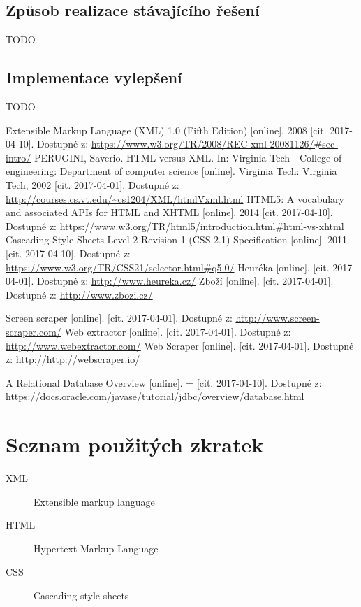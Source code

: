 \documentclass[thesis=B,czech]{FITthesis}[2012/06/26]
\begin{document}
\section{Způsob realizace stávajícího řešení}
TODO
\section{Implementace vylepšení}
TODO

\begin{conclusion}
\end{conclusion}




\begin{thebibliography}{}

	{Extensible Markup Language (XML) 1.0 (Fifth Edition) [online]. 2008 [cit. 2017-04-10]. 
	Dostupné z:
	\url{ https://www.w3.org/TR/2008/REC-xml-20081126/#sec-intro/}
	}
	{PERUGINI, Saverio. HTML versus XML. 
	In: Virginia Tech - College of engineering: Department of computer science [online]. 
	Virginia Tech: Virginia Tech, 2002 [cit. 2017-04-01]. Dostupné z: 
	\url{http://courses.cs.vt.edu/~cs1204/XML/htmlVxml.html}
	}
	{
	HTML5: A vocabulary and associated APIs for HTML and XHTML [online]. 2014 [cit. 2017-04-10]. 
	Dostupné z: 
	\url{https://www.w3.org/TR/html5/introduction.html#html-vs-xhtml}
	}
	{Cascading Style Sheets Level 2 Revision 1 (CSS 2.1) 
	Specification [online]. 2011 [cit. 2017-04-10]. 
	Dostupné z:
	\url{https://www.w3.org/TR/CSS21/selector.html#q5.0/}}	
	{Heuréka [online]. [cit. 2017-04-01]. Dostupné z:
	\url{http://www.heureka.cz/}}
	{Zboží [online]. [cit. 2017-04-01]. Dostupné z:
	\url{http://www.zbozi.cz/}}	

	
	
	
	{Screen scraper [online]. [cit. 2017-04-01]. Dostupné z:
	\url{http://www.screen-scraper.com/}}	
	{Web extractor [online]. [cit. 2017-04-01]. Dostupné z:
	\url{http://www.webextractor.com/}}		
	{Web Scraper [online]. [cit. 2017-04-01]. Dostupné z:
	\url{http://http://webscraper.io/}}		
	
	{
	A Relational Database Overview [online]. = [cit. 2017-04-10]. 
	Dostupné z: 
	\url{https://docs.oracle.com/javase/tutorial/jdbc/overview/database.html}
	}
\appendix
\chapter{Seznam použitých zkratek}
\begin{description}
	\item[XML] Extensible markup language
	\item[HTML] Hypertext Markup Language
	\item[CSS] Cascading style sheets
\end{description}

\end{thebibliography}
\end{document}
